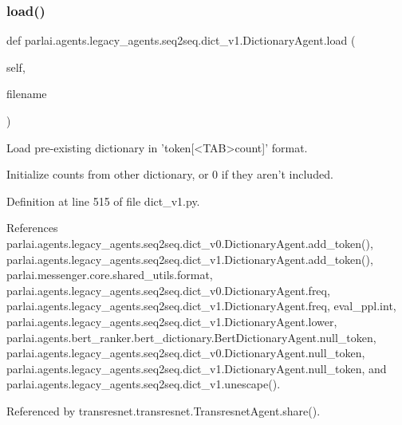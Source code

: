 \subsubsection{\texorpdfstring{load()}{load()}}
{\footnotesize\ttfamily def parlai.\+agents.\+legacy\+\_\+agents.\+seq2seq.\+dict\+\_\+v1.\+Dictionary\+Agent.\+load (\begin{DoxyParamCaption}\item[{}]{self,  }\item[{}]{filename }\end{DoxyParamCaption})}

\begin{DoxyVerb}Load pre-existing dictionary in 'token[<TAB>count]' format.

Initialize counts from other dictionary, or 0 if they aren't included.
\end{DoxyVerb}
 

Definition at line 515 of file dict\+\_\+v1.\+py.



References parlai.\+agents.\+legacy\+\_\+agents.\+seq2seq.\+dict\+\_\+v0.\+Dictionary\+Agent.\+add\+\_\+token(), parlai.\+agents.\+legacy\+\_\+agents.\+seq2seq.\+dict\+\_\+v1.\+Dictionary\+Agent.\+add\+\_\+token(), parlai.\+messenger.\+core.\+shared\+\_\+utils.\+format, parlai.\+agents.\+legacy\+\_\+agents.\+seq2seq.\+dict\+\_\+v0.\+Dictionary\+Agent.\+freq, parlai.\+agents.\+legacy\+\_\+agents.\+seq2seq.\+dict\+\_\+v1.\+Dictionary\+Agent.\+freq, eval\+\_\+ppl.\+int, parlai.\+agents.\+legacy\+\_\+agents.\+seq2seq.\+dict\+\_\+v1.\+Dictionary\+Agent.\+lower, parlai.\+agents.\+bert\+\_\+ranker.\+bert\+\_\+dictionary.\+Bert\+Dictionary\+Agent.\+null\+\_\+token, parlai.\+agents.\+legacy\+\_\+agents.\+seq2seq.\+dict\+\_\+v0.\+Dictionary\+Agent.\+null\+\_\+token, parlai.\+agents.\+legacy\+\_\+agents.\+seq2seq.\+dict\+\_\+v1.\+Dictionary\+Agent.\+null\+\_\+token, and parlai.\+agents.\+legacy\+\_\+agents.\+seq2seq.\+dict\+\_\+v1.\+unescape().



Referenced by transresnet.\+transresnet.\+Transresnet\+Agent.\+share().

